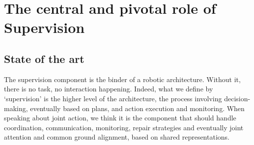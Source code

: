 \documentclass[a4paper,11pt,twoside]{StyleThese}
\begin{document}
	\setcounter{chapter}{3} %
	\dominitoc
	\faketableofcontents
	\fi
	
	
\chapter{The central and pivotal role of Supervision}
\minitoc
\section{State of the art}\label{chap1:subsec:state_art_sup}
The supervision component is the binder of a robotic architecture. Without it, there is no task, no interaction happening. Indeed, what we define by `supervision' is the higher level of the architecture, the process involving decision-making, eventually based on plans, and action execution and monitoring. When speaking about joint action, we think it is the component that should handle coordination, communication, monitoring, repair strategies and eventually joint attention and common ground alignment, based on shared representations.
\end{document}
